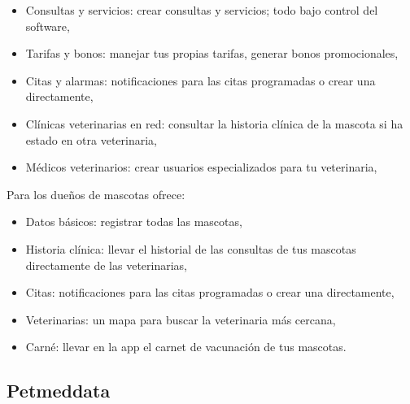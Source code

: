 %		

\begin{itemize}
	\item	Consultas y servicios: crear consultas y servicios; todo bajo control del software,
	\item	Tarifas y bonos: manejar tus propias tarifas, generar bonos promocionales,
	\item	Citas y alarmas: notificaciones para las citas programadas o crear una directamente,
	\item	Clínicas veterinarias en red: consultar la historia clínica de la mascota si ha estado en otra veterinaria,
	\item	Médicos veterinarios: crear usuarios especializados para tu veterinaria,
\end{itemize}
Para los dueños de mascotas ofrece:
\begin{itemize}
	\item	Datos básicos: registrar todas las mascotas,
	\item	Historia clínica: llevar el historial de las consultas de tus mascotas directamente de las veterinarias,
	\item	Citas: notificaciones para las citas programadas o crear una directamente,
	\item	Veterinarias: un mapa para buscar la veterinaria más cercana,
	\item	Carné: llevar en la app el carnet de vacunación de tus mascotas.
\end{itemize}

\subsection{Petmeddata}\label{chapter:introduction}



